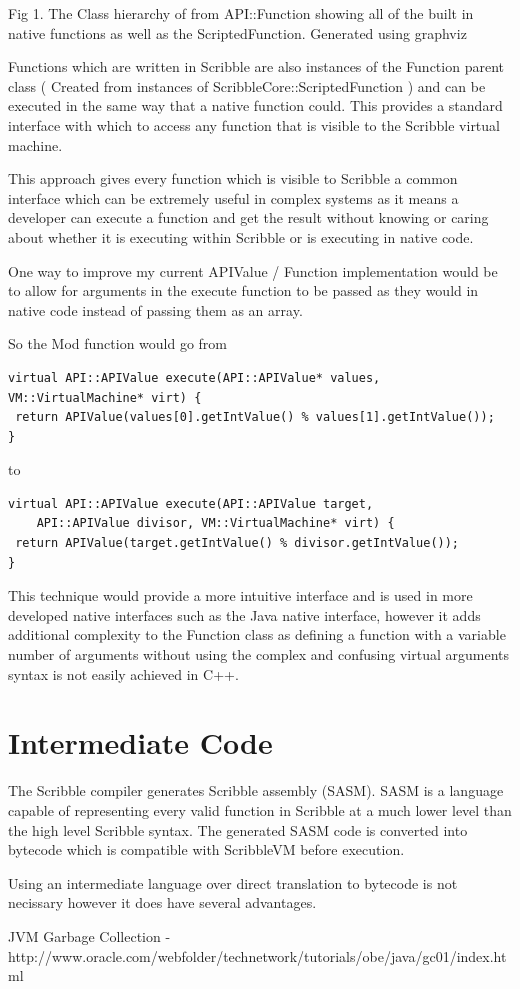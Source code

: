 \documentclass[]{final_report}
\begin{document}
Fig 1. The Class hierarchy of from API::Function showing all of the built in native functions as well as the ScriptedFunction. Generated using graphviz

Functions which are written in Scribble are also instances of the Function parent class ( Created from instances of ScribbleCore::ScriptedFunction ) and can be executed in the same way that a native function could. This provides a standard interface with which to access any function that is visible to the Scribble virtual machine.

This approach gives every function which is visible to Scribble a common interface which can be extremely useful in complex systems as it means a developer can execute a function and get the result without knowing or caring about whether it is executing within Scribble or is executing in native code.

One way to improve my current APIValue / Function implementation would be to allow for arguments in the execute function to be passed as they would in native code instead of passing them as an array.

So the Mod function would go from
\begin{verbatim}
virtual API::APIValue execute(API::APIValue* values, VM::VirtualMachine* virt) {
 return APIValue(values[0].getIntValue() % values[1].getIntValue());
}
\end{verbatim}
to
\begin{verbatim}
virtual API::APIValue execute(API::APIValue target, 
    API::APIValue divisor, VM::VirtualMachine* virt) {
 return APIValue(target.getIntValue() % divisor.getIntValue());
}
\end{verbatim}

This technique would provide a more intuitive interface and is used in more developed native interfaces such as the Java native interface, however it adds additional complexity to the Function class as defining a function with a variable number of arguments without using the complex and confusing virtual arguments syntax is not easily achieved in C++.

\chapter{Intermediate Code}

The Scribble compiler generates Scribble assembly (SASM). SASM is a language capable of representing every valid function in Scribble at a much lower level than the high level Scribble syntax. The generated SASM code is converted into bytecode which is compatible with ScribbleVM before execution.

Using an intermediate language over direct translation to bytecode is not necissary however it does have several advantages.

\newpage
\begin{thebibliography}{99}
JVM Garbage Collection - http://www.oracle.com/webfolder/technetwork/tutorials/obe/java/gc01/index.html
\end{thebibliography}
\label{endpage}
\end{document}
